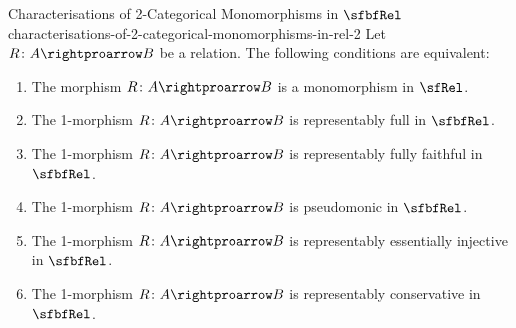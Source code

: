 \begin{proposition}{Characterisations of 2-Categorical Monomorphisms in $\sfbfRel$ \rmII}{characterisations-of-2-categorical-monomorphisms-in-rel-2}%
    Let $R\colon A\rightproarrow B$ be a relation. The following conditions are equivalent:
    \begin{enumerate}
        \item\label{characterisations-of-2-categorical-monomorphisms-in-rel-2-1}The morphism $R\colon A\rightproarrow B$ is a monomorphism in $\sfRel$.
        \item\label{characterisations-of-2-categorical-monomorphisms-in-rel-2-2}The 1-morphism $R\colon A\rightproarrow B$ is representably full in $\sfbfRel$.
        \item\label{characterisations-of-2-categorical-monomorphisms-in-rel-2-3}The 1-morphism $R\colon A\rightproarrow B$ is representably fully faithful in $\sfbfRel$.
        \item\label{characterisations-of-2-categorical-monomorphisms-in-rel-2-4}The 1-morphism $R\colon A\rightproarrow B$ is pseudomonic in $\sfbfRel$.
        \item\label{characterisations-of-2-categorical-monomorphisms-in-rel-2-5}The 1-morphism $R\colon A\rightproarrow B$ is representably essentially injective in $\sfbfRel$.
        \item\label{characterisations-of-2-categorical-monomorphisms-in-rel-2-6}The 1-morphism $R\colon A\rightproarrow B$ is representably conservative in $\sfbfRel$.
    \end{enumerate}
\end{proposition}
